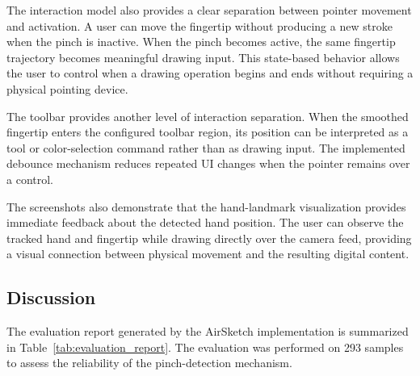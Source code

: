 \documentclass[conference]{IEEEtran}
\begin{document}
The interaction model also provides a clear separation between pointer movement and activation. A user can move the fingertip without producing a new stroke when the pinch is inactive. When the pinch becomes active, the same fingertip trajectory becomes meaningful drawing input. This state-based behavior allows the user to control when a drawing operation begins and ends without requiring a physical pointing device.

The toolbar provides another level of interaction separation. When the smoothed fingertip enters the configured toolbar region, its position can be interpreted as a tool or color-selection command rather than as drawing input. The implemented debounce mechanism reduces repeated UI changes when the pointer remains over a control.

The screenshots also demonstrate that the hand-landmark visualization provides immediate feedback about the detected hand position. The user can observe the tracked hand and fingertip while drawing directly over the camera feed, providing a visual connection between physical movement and the resulting digital content.

\subsection{Discussion}

The evaluation report generated by the AirSketch implementation is summarized in Table~\ref{tab:evaluation_report}. The evaluation was performed on 293 samples to assess the reliability of the pinch-detection mechanism.
\end{document}
